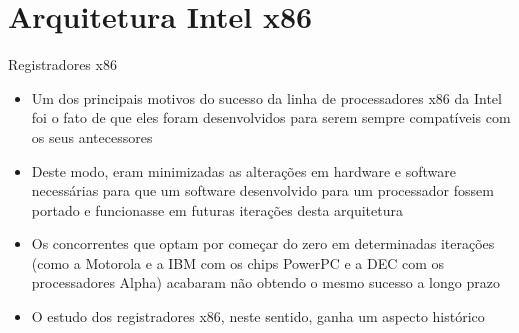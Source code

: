 \section{Arquitetura Intel x86}

\begin{frame}[fragile]{Registradores x86}

    \begin{itemize}
        \item Um dos principais motivos do sucesso da linha de processadores x86 da Intel foi
            o fato de que eles foram desenvolvidos para serem sempre compatíveis com os seus
            antecessores

        \item Deste modo, eram minimizadas as alterações em hardware e software necessárias para
            que um software desenvolvido para um processador fossem portado e funcionasse em
            futuras iterações desta arquitetura

        \item Os concorrentes que optam por começar do zero em determinadas iterações (como a 
            Motorola e a IBM com os chips PowerPC e a DEC com os processadores Alpha) acabaram
            não obtendo o mesmo sucesso a longo prazo

        \item O estudo dos registradores x86, neste sentido, ganha um aspecto histórico
    \end{itemize}

\end{frame}

